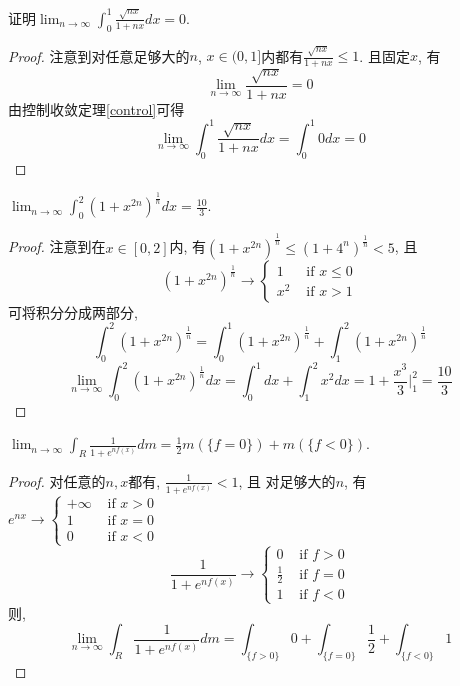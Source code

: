 \documentclass[12pt, a4paper, oneside, UTF8]{ctexbook}  %
\begin{document}
\begin{example}
    证明$\lim_{n\to\infty}\int_{0}^{1}\frac{\sqrt{nx}}{1+nx}dx=0$.
\end{example}

\begin{proof}
    注意到对任意足够大的$n$, $x\in (0,1]$内都有$\frac{\sqrt{nx}}{1+nx}\leq 1$. 且固定$x$, 有
    $$ \lim_{n\to\infty}\frac{\sqrt{nx}}{1+nx}=0 $$ 
    由控制收敛定理\ref{control}可得$$  \lim_{n\to\infty}\int_{0}^{1}\frac{\sqrt{nx}}{1+nx}dx=\int_{0}^{1} 0 dx=0  $$
\end{proof}
\vspace{1cm}

\begin{example}
    $\lim_{n\to\infty}\int_{0}^{2}(1+x^{2n})^{\frac{1}{n}}dx=\frac{10}{3}$.
\end{example}

\begin{proof}
    注意到在$x\in[0, 2]$内, 有$(1+x^{2n})^{\frac{1}{n}}\leq (1+4^{n})^{\frac{1}{n}}<5$, 且
    $$(1+x^{2n})^{\frac{1}{n}} \rightarrow\left\{\begin{array}{ll}1 & \text { if } x\leq 0 \\ x^2 & \text { if } x>1\end{array}\right.$$
    可将积分分成两部分, $$ \int_{0}^{2}(1+x^{2n})^{\frac{1}{n}}=\int_{0}^{1}(1+x^{2n})^{\frac{1}{n}}+\int_{1}^{2}(1+x^{2n})^{\frac{1}{n}} $$
    $$ \lim_{n\to\infty}\int_{0}^{2}(1+x^{2n})^{\frac{1}{n}}dx= \int_{0}^{1} dx + \int_{1}^{2}x^2 dx=
    1+\frac{x^3}{3}\Bigg|^{2}_{1}=\frac{10}{3} $$
\end{proof}
\vspace{1cm}


\begin{example}
    $\lim_{n\to\infty}\int_{R}\frac{1}{1+e^{nf(x)}}dm=\frac{1}{2}m(\{f=0\})+m(\{f<0\})$.
\end{example}

\begin{proof}
    对任意的$n, x$都有, $\frac{1}{1+e^{nf(x)}}<1$, 且
    对足够大的$n$, 有$e^{n x} \rightarrow\left\{\begin{array}{ll}+\infty & \text { if } x>0 \\ 1 & \text { if } x=0 \\ 0 & \text { if } x<0\end{array}\right.$
    $$\frac{1}{1+e^{nf(x)}} \rightarrow\left\{\begin{array}{ll}0 & \text { if } f>0 \\ \frac{1}{2} & \text { if } f=0 \\ 1 & \text { if } f<0\end{array}\right.$$
    则, $$\lim_{n\to\infty}\int_{R}\frac{1}{1+e^{nf(x)}}dm=\int_{\{f>0\}} 0 + \int_{\{f=0\}}\frac{1}{2} + \int_{\{f<0\}} 1$$
\end{proof}
\vspace{1cm}
\end{document}
